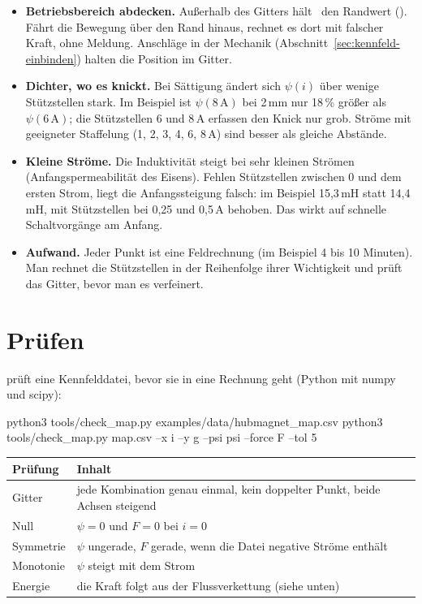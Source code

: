 \begin{itemize}
  \item \textbf{Betriebsbereich abdecken.} Außerhalb des Gitters hält \esim\ den
    Randwert (). Fährt die Bewegung über den Rand hinaus,
    rechnet es dort mit falscher Kraft, ohne Meldung. Anschläge in der Mechanik
    (Abschnitt~\ref{sec:kennfeld-einbinden}) halten die Position im Gitter.
  \item \textbf{Dichter, wo es knickt.} Bei Sättigung ändert sich $\psi(i)$ über
    wenige Stützstellen stark. Im Beispiel ist $\psi(8\,\mathrm{A})$ bei 2\,mm
    nur 18\,\% größer als $\psi(6\,\mathrm{A})$; die Stützstellen 6 und 8\,A
    erfassen den Knick nur grob. Ströme mit geeigneter Staffelung (1, 2, 3, 4, 6, 8\,A)
    sind besser als gleiche Abstände.
  \item \textbf{Kleine Ströme.} Die Induktivität steigt bei sehr kleinen Strömen
    (Anfangspermeabilität des Eisens). Fehlen Stützstellen zwischen 0 und dem
    ersten Strom, liegt die Anfangssteigung falsch: im Beispiel 15,3\,mH statt
    14,4\,mH, mit Stützstellen bei 0,25 und 0,5\,A behoben. Das wirkt auf schnelle
    Schaltvorgänge am Anfang.
  \item \textbf{Aufwand.} Jeder Punkt ist eine Feldrechnung (im Beispiel 4 bis
    10 Minuten). Man rechnet die Stützstellen in der Reihenfolge ihrer
    Wichtigkeit und prüft das Gitter, bevor man es verfeinert.
\end{itemize}

\section{Prüfen}
\label{sec:kennfeld-pruefen}

 prüft eine Kennfelddatei, bevor sie in eine
Rechnung geht (Python mit numpy und scipy):

\begin{shell}
python3 tools/check_map.py examples/data/hubmagnet_map.csv
python3 tools/check_map.py map.csv --x i --y g --psi psi --force F --tol 5
\end{shell}

\begin{longtable}{@{}P{2.6cm}P{11.2cm}@{}}
  \toprule
  Prüfung & Inhalt \\
  \midrule
  \endhead
  \bottomrule
  \endfoot
  Gitter & jede Kombination genau einmal, kein doppelter Punkt, beide Achsen steigend \\
  Null & $\psi=0$ und $F=0$ bei $i=0$ \\
  Symmetrie & $\psi$ ungerade, $F$ gerade, wenn die Datei negative Ströme enthält \\
  Monotonie & $\psi$ steigt mit dem Strom \\
  Energie & die Kraft folgt aus der Flussverkettung (siehe unten) \\
\end{longtable}

